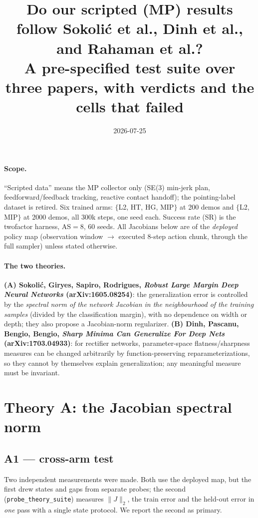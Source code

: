 \documentclass[10pt]{article}
\title{Do our scripted (MP) results follow Sokoli\'c et al., Dinh et al.,
and Rahaman et al.?\\
{\large A pre-specified test suite over three papers, with verdicts and
the cells that failed}}
\date{2026-07-25}
\begin{document}
\maketitle

\paragraph{Scope.} ``Scripted data'' means the MP collector only (SE(3)
min-jerk plan, feedforward/feedback tracking, reactive contact handoff);
the pointing-label dataset is retired. Six trained arms: $\{$L2, HT, HG,
MIP$\}$ at 200 demos and $\{$L2, MIP$\}$ at 2000 demos, all 300k steps,
one seed each. Success rate (SR) is the twofactor harness, AS$=8$, 60
seeds. All Jacobians below are of the \emph{deployed} policy map
(observation window $\to$ executed 8-step action chunk, through the full
sampler) unless stated otherwise.

\paragraph{The two theories.}
\textbf{(A) Sokoli\'c, Giryes, Sapiro, Rodrigues, \emph{Robust Large
Margin Deep Neural Networks} (arXiv:1605.08254)}: the generalization
error is controlled by the \emph{spectral norm of the network Jacobian in
the neighbourhood of the training samples} (divided by the classification
margin), with no dependence on width or depth; they also propose a
Jacobian-norm regularizer.
\textbf{(B) Dinh, Pascanu, Bengio, Bengio, \emph{Sharp Minima Can
Generalize For Deep Nets} (arXiv:1703.04933)}: for rectifier networks,
parameter-space flatness/sharpness measures can be changed arbitrarily by
function-preserving reparameterizations, so they cannot by themselves
explain generalization; any meaningful measure must be invariant.

\section{Theory A: the Jacobian spectral norm}

\subsection*{A1 --- cross-arm test}
Two independent measurements were made. Both use the deployed map, but
the first drew states and gaps from separate probes; the second
(\texttt{probe\_theory\_suite}) measures $\|J\|_2$, the train error and
the held-out error in \emph{one} pass with a single state protocol. We
report the second as primary.
\end{document}
